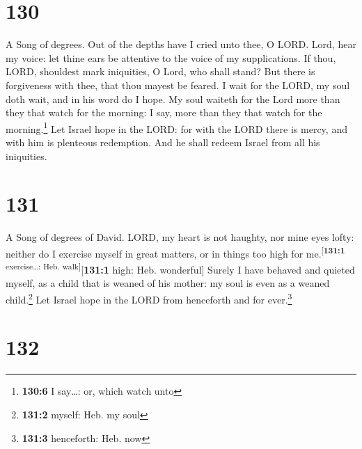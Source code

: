 \hypertarget{section-131}{%
\section{130}\label{section-131}}

A Song of degrees.  Out of the depths have I cried unto
thee, O LORD.  Lord, hear my voice: let thine ears be
attentive to the voice of my supplications.  If thou,
LORD, shouldest mark iniquities, O Lord, who shall stand? 
But there is forgiveness with thee, that thou mayest be feared.
 I wait for the LORD, my soul doth wait, and in his word
do I hope.  My soul waiteth for the Lord more than they
that watch for the morning: I say, more than they that watch for the
morning.\footnote{\textbf{130:6} I say\ldots: or, which watch unto}
 Let Israel hope in the LORD: for with the LORD there is
mercy, and with him is plenteous redemption.  And he shall
redeem Israel from all his iniquities.

\hypertarget{section-132}{%
\section{131}\label{section-132}}

A Song of degrees of David.  LORD, my heart is not
haughty, nor mine eyes lofty: neither do I exercise myself in great
matters, or in things too high for me.\textsuperscript{{[}\textbf{131:1}
exercise\ldots: Heb. walk{]}}{[}\textbf{131:1} high: Heb. wonderful{]}
 Surely I have behaved and quieted myself, as a child that
is weaned of his mother: my soul is even as a weaned child.\footnote{\textbf{131:2}
  myself: Heb. my soul}  Let Israel hope in the LORD from
henceforth and for ever.\footnote{\textbf{131:3} henceforth: Heb. now}

\hypertarget{section-133}{%
\section{132}\label{section-133}}

